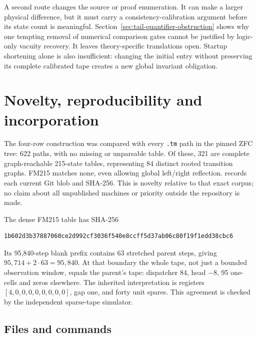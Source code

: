 \documentclass[11pt,a4paper]{article}
\begin{document}
A second route changes the source or proof enumeration. It can make a
larger physical difference, but it must carry a consistency-calibration
argument before its state count is meaningful. Section~\ref{sec:tail-quantifier-obstruction}
shows why one tempting removal of numerical comparison gates cannot be
justified by logic-only vacuity recovery. It leaves theory-specific
translations open. Startup shortening alone is also insufficient: changing
the initial entry without preserving its complete calibrated tape creates
a new global invariant obligation.

\section{Novelty, reproducibility and incorporation}
\label{sec:reproduction}

The four-row construction was compared with every \texttt{.tm} path in
the pinned ZFC tree: 622 paths, with no missing or unparsable table. Of
these, 321 are complete graph-reachable 215-state tables, representing
84 distinct rooted transition graphs. FM215 matches none, even allowing
global left/right reflection. 
records each current Git blob and SHA-256. This is novelty relative to
that exact corpus; no claim about all unpublished machines or priority
outside the repository is made.

The dense FM215 table has SHA-256
\begin{verbatim}
1b602d3b37887060ce2d992cf3036f540e8ccff5d37ab06c80f19f1edd38cbc6
\end{verbatim}
Its 95,840-step blank prefix contains 63 stretched parent steps, giving
$95{,}714+2\cdot63=95{,}840$. At that boundary the whole tape, not just a
bounded observation window, equals the parent's tape: dispatcher 84,
head $-8$, 95 one-cells and zeros elsewhere. The inherited interpretation
is registers $[4,0,0,0,0,0,0,0,0]$, gap one, and forty unit spares.
This agreement is checked by the independent sparse-tape simulator.

\subsection{Files and commands}
\end{document}
